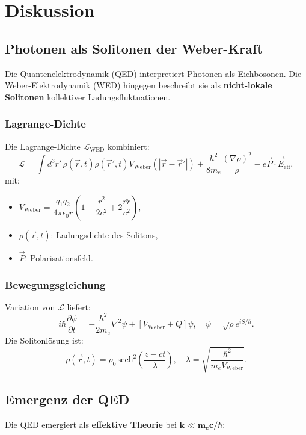 \chapter{Diskussion}

\section{Photonen als Solitonen der Weber-Kraft}
Die Quantenelektrodynamik (QED) interpretiert Photonen als Eichbosonen. Die Weber-Elektrodynamik (WED) hingegen beschreibt sie als \textbf{nicht-lokale Solitonen} kollektiver Ladungsfluktuationen.  

\subsection{Lagrange-Dichte}
Die Lagrange-Dichte $\mathcal{L}_{\text{WED}}$ kombiniert:  
\begin{equation}
\mathcal{L} = \int d^3r'\, \rho(\vec{r},t) \rho(\vec{r}',t) V_{\text{Weber}}(|\vec{r}-\vec{r}'|) + \frac{\hbar^2}{8m_e} \frac{(\nabla \rho)^2}{\rho} - e \vec{P} \cdot \vec{E}_{\text{eff}},
\end{equation}
mit:
\begin{itemize}
    \item $V_{\text{Weber}} = \dfrac{q_1 q_2}{4\pi \epsilon_0 r} \left(1 - \dfrac{\dot{r}^2}{2c^2} + 2 \dfrac{r \ddot{r}}{c^2}\right)$,
    \item $\rho(\vec{r},t)$: Ladungsdichte des Solitons,
    \item $\vec{P}$: Polarisationsfeld.
\end{itemize}

\subsection{Bewegungsgleichung}
Variation von $\mathcal{L}$ liefert:  
\begin{equation}
i\hbar \frac{\partial \psi}{\partial t} = -\frac{\hbar^2}{2m_e} \nabla^2 \psi + \left[ V_{\text{Weber}} + Q \right] \psi, \quad \psi = \sqrt{\rho} e^{iS/\hbar}.
\end{equation}
Die Solitonlösung ist:  
\begin{equation}
\rho(\vec{r},t) = \rho_0 \, \text{sech}^2\left(\frac{z - ct}{\lambda}\right), \quad \lambda = \sqrt{\frac{\hbar^2}{m_e V_{\text{Weber}}}}.
\end{equation}

\section{Emergenz der QED}
Die QED emergiert als \textbf{effektive Theorie} bei $\mathbf{k \ll m_e c/\hbar}$:  

